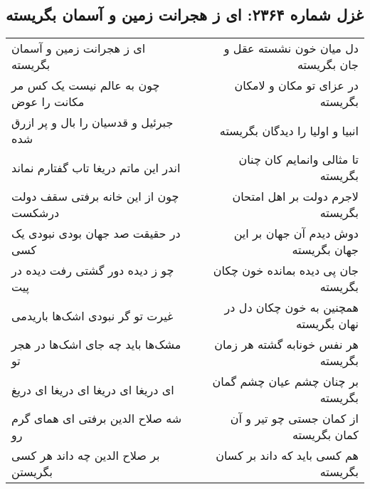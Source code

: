 \begin{center}
\section*{غزل شماره ۲۳۶۴: ای ز هجرانت زمین و آسمان بگریسته}
\label{sec:2364}
\begin{longtable}{l p{0.5cm} r}
ای ز هجرانت زمین و آسمان بگریسته
&&
دل میان خون نشسته عقل و جان بگریسته
\\
چون به عالم نیست یک کس مر مکانت را عوض
&&
در عزای تو مکان و لامکان بگریسته
\\
جبرئیل و قدسیان را بال و پر ازرق شده
&&
انبیا و اولیا را دیدگان بگریسته
\\
اندر این ماتم دریغا تاب گفتارم نماند
&&
تا مثالی وانمایم کان چنان بگریسته
\\
چون از این خانه برفتی سقف دولت درشکست
&&
لاجرم دولت بر اهل امتحان بگریسته
\\
در حقیقت صد جهان بودی نبودی یک کسی
&&
دوش دیدم آن جهان بر این جهان بگریسته
\\
چو ز دیده دور گشتی رفت دیده در پیت
&&
جان پی دیده بمانده خون چکان بگریسته
\\
غیرت تو گر نبودی اشک‌ها باریدمی
&&
همچنین به خون چکان دل در نهان بگریسته
\\
مشک‌ها باید چه جای اشک‌ها در هجر تو
&&
هر نفس خونابه گشته هر زمان بگریسته
\\
ای دریغا ای دریغا ای دریغا ای دریغ
&&
بر چنان چشم عیان چشم گمان بگریسته
\\
شه صلاح الدین برفتی ای همای گرم رو
&&
از کمان جستی چو تیر و آن کمان بگریسته
\\
بر صلاح الدین چه داند هر کسی بگریستن
&&
هم کسی باید که داند بر کسان بگریسته
\\
\end{longtable}
\end{center}
